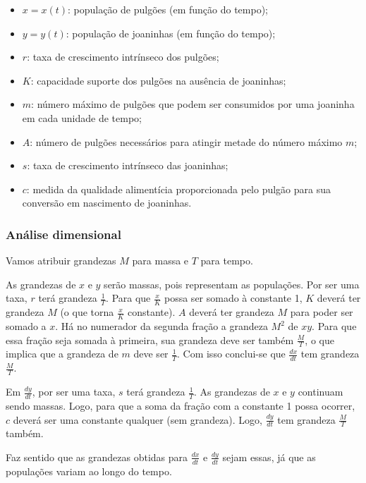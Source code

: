 \begin{itemize}
    \item $x=x(t)$: população de pulgões (em função do tempo); 
    \item $y=y(t)$: população de joaninhas (em função do tempo);
    \item $r$: taxa de crescimento intrínseco dos pulgões;
    \item $K$: capacidade suporte dos pulgões na ausência de joaninhas;
    \item $m$: número máximo de pulgões que podem ser consumidos por uma joaninha em cada unidade de tempo;
    \item $A$: número de pulgões necessários para atingir metade do número máximo $m$;
    \item $s$: taxa de crescimento intrínseco das joaninhas;
    \item $c$: medida da qualidade alimentícia proporcionada pelo pulgão para sua conversão em nascimento de joaninhas.
\end{itemize}

\subsubsection{Análise dimensional}

Vamos atribuir grandezas $M$ para massa e $T$ para tempo.

As grandezas de $x$ e $y$ serão massas, pois representam as populações. Por ser uma taxa, $r$ terá grandeza $\frac{1}{T}$. Para que $\frac{x}{K}$ possa ser somado à constante 1, $K$ deverá ter grandeza $M$ (o que torna $\frac{x}{K}$ constante). $A$ deverá ter grandeza $M$ para poder ser somado a $x$. Há no numerador da segunda fração a grandeza $M^2$ de $xy$. Para que essa fração seja somada à primeira, sua grandeza deve ser também $\frac{M}{T}$, o que implica que a grandeza de $m$ deve ser $\frac{1}{T}$. Com isso conclui-se que $\frac{dx}{dt}$ tem grandeza $\frac{M}{T}$.

Em $\frac{dy}{dt}$, por ser uma taxa, $s$ terá grandeza $\frac{1}{T}$. As grandezas de $x$ e $y$ continuam sendo massas. Logo, para que a soma da fração com a constante 1 possa ocorrer, $c$ deverá ser uma constante qualquer (sem grandeza). Logo, $\frac{dy}{dt}$ tem grandeza $\frac{M}{T}$ também.

Faz sentido que as grandezas obtidas para $\frac{dx}{dt}$ e $\frac{dy}{dt}$ sejam essas, já que as populações variam ao longo do tempo.

